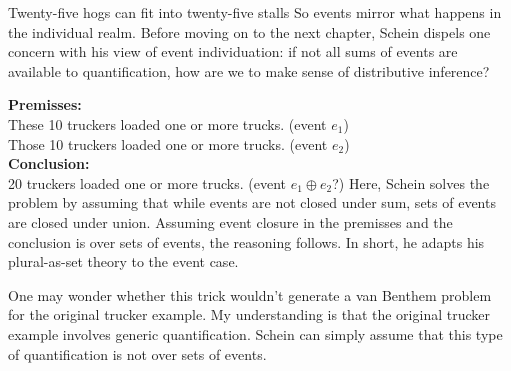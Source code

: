  \ex
 Twenty-five hogs can fit into twenty-five stalls
 \xe
 So events mirror what happens in the individual realm. Before moving on to the next chapter, Schein dispels one concern with his view of event individuation: if not all sums of events are available to quantification, how are we to make sense of distributive inference?

 \pex
 \a \textbf{Premisses:}\\
These 10 truckers loaded one or more trucks. (event $e_1$)\\
Those 10 truckers loaded one or more trucks. (event $e_2$)\\
 \a \textbf{Conclusion:}\\
 20 truckers loaded one or more trucks. (event $e_1\oplus e_2$?)
 \xe
 Here, Schein solves the problem by assuming that while events are not closed under sum, sets of events are closed under union. Assuming event closure in the premisses and the conclusion is over sets of events, the reasoning follows. In short, he adapts his plural-as-set theory to the event case.

 One may wonder whether this trick wouldn't generate a van Benthem problem for the original trucker example. My understanding is that the original trucker example involves generic quantification. Schein can simply assume that this type of quantification is not over sets of events.


